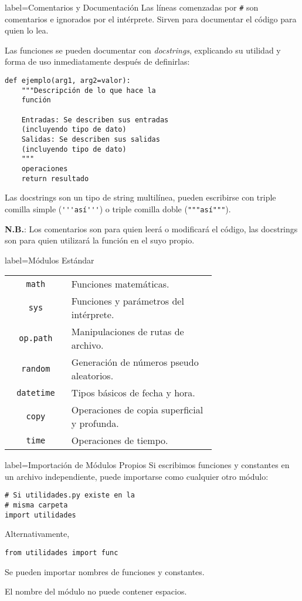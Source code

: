 \begin{contentbox}{label=Comentarios y Documentación}
    Las líneas comenzadas por \lstinline!#! son comentarios e ignorados por el intérprete. Sirven para documentar el código para quien lo lea.
    
    Las funciones se pueden documentar con \textit{docstrings}, explicando su utilidad y forma de uso inmediatamente después de definirlas:
\begin{lstlisting}
def ejemplo(arg1, arg2=valor):
    """Descripción de lo que hace la
    función
    
    Entradas: Se describen sus entradas 
    (incluyendo tipo de dato)
    Salidas: Se describen sus salidas 
    (incluyendo tipo de dato)
    """
    operaciones
    return resultado
\end{lstlisting}

    Las docstrings son un tipo de string multilínea, pueden escribirse con triple comilla simple (\lstinline!'''así'''!) o triple comilla doble (\lstinline!"""así"""!).
    
    \textbf{N.B.}: Los comentarios son para quien leerá o modificará el código, las docstrings son para quien utilizará la función en el suyo propio.
\end{contentbox}

\begin{contentbox}{label=Módulos Estándar}
    \small
    \begin{tabular}{C|p{0.7\linewidth}}
        \lstinline!math! & Funciones matemáticas. \\
        \lstinline!sys! & Funciones y parámetros del intérprete. \\
        \lstinline!op.path! & Manipulaciones de rutas de archivo. \\
        \lstinline!random! & Generación de números pseudo aleatorios. \\
        \lstinline!datetime! & Tipos básicos de fecha y hora. \\
        \lstinline!copy! & Operaciones de copia superficial y profunda. \\
        \lstinline!time! & Operaciones de tiempo. \\
    \end{tabular}
\end{contentbox}

\begin{contentbox}{label=Importación de Módulos Propios}
    Si escribimos funciones y constantes en un archivo independiente, puede importarse como cualquier otro módulo:
\begin{lstlisting}
# Si utilidades.py existe en la
# misma carpeta
import utilidades
\end{lstlisting}

Alternativamente,
\begin{lstlisting}
from utilidades import func
\end{lstlisting}
    
    Se pueden importar nombres de funciones y constantes.
    
    El nombre del módulo no puede contener espacios.
\end{contentbox}

